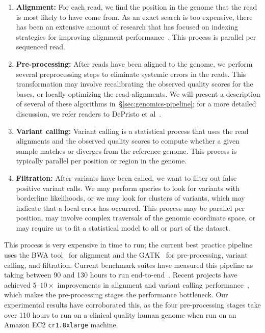 \documentclass[masters]{ucbthesis}
\begin{document}
\begin{enumerate}
\item \textbf{Alignment:} For each read, we find the position in the genome that the read is most likely to
have come from. As an exact search is too expensive, there has been an extensive amount of research
that has focused on indexing strategies for improving alignment performance~\cite{li10, li11wham,
zaharia11}. This process is parallel per sequenced read.
\item \textbf{Pre-processing:} After reads have been aligned to the genome, we perform several
preprocessing steps to eliminate systemic errors in the reads. This transformation may involve recalibrating the
observed quality scores for the bases, or locally optimizing the read alignments. We will present a
description of several of these algorithms in~\S\ref{sec:genomics-pipeline}; for a more detailed
discussion, we refer readers to DePristo et al~\cite{depristo11}.
\item \textbf{Variant calling:} Variant calling is a statistical process that uses the read alignments
and the observed quality scores to compute whether a given sample matches or diverges
from the reference genome. This process is typically parallel per position or region in the genome.
\item \textbf{Filtration:} After variants have been called, we want to filter out false positive variant calls.
We may perform queries to look for variants with borderline likelihoods, or we may look for clusters of
variants, which may indicate that a local error has occurred. This process may be parallel per position,
may involve complex traversals of the genomic coordinate space, or may require us to fit a statistical
model to all or part of the dataset.
\end{enumerate}

This process is very expensive in time to run; the current best practice pipeline uses the BWA
tool~\cite{li10} for alignment and the GATK~\cite{depristo11, mckenna10} for pre-processing, variant
calling, and filtration. Current benchmark suites have measured this pipeline as taking between 90 and
130 hours to run end-to-end~\cite{talwalkar14}. Recent projects have achieved 5--$10\times$
improvements in alignment and variant calling performance~\cite{rimmer14, zaharia11}, which makes the
pre-processing stages the performance bottleneck. Our experimental results have corroborated this, as
the four pre-processing stages take over 110 hours to run on a clinical quality human genome when run
on an Amazon EC2 \texttt{cr1.8xlarge} machine. 
\end{document}
